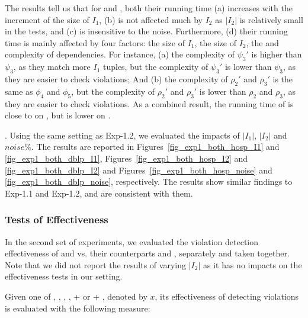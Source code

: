 The results tell us that for \CINDs and \pCINDs, both their running time (a) increases with the increment of the size of $I_1$, (b) is not affected much by $I_2$ as $|I_2|$ is relatively small in the tests, and (c) is insensitive to the noise. Furthermore, (d) their running time is mainly affected by four factors: the size of $I_1$, the size of $I_2$, the \LHS and \RHS complexity of dependencies.
For instance, (a) the \LHS complexity of \CIND $\psi_3'$ is higher than \pCFD $\psi_3$, as they match more $I_1$ tuples, but
the \RHS complexity of \CIND $\psi_3'$ is lower than \pCIND $\psi_3$, as they are easier to check violations; And
(b) the \LHS complexity of \CINDs $\rho_2'$ and $\rho_3'$ is the same as  \pCFDs $\phi_4$ and $\phi_5$, but
 the \RHS complexity of \CINDs $\rho_2'$ and $\rho_3'$ is lower than \pCINDs $\rho_2$ and $\rho_3$, as they are easier to check violations.
As a combined result, the running time of \CINDs is close to \pCFDs on \hosp, but is lower on \dblp.

.
Using the same setting as {Exp-1.2}, we evaluated the impacts of $|I_1|$, $|I_2|$ and $noise\%$. The results are reported in Figures~\ref{fig_exp1_both_hosp_I1} and \ref{fig_exp1_both_dblp_I1}, Figures~\ref{fig_exp1_both_hosp_I2} and \ref{fig_exp1_both_dblp_I2} and Figures~\ref{fig_exp1_both_hosp_noise} and \ref{fig_exp1_both_dblp_noise}, respectively. The results show similar findings to {Exp-1.1} and {Exp-1.2}, and are consistent with them.



\vspace{-1ex}
\subsubsection{Tests of Effectiveness}


In the second set of experiments, we evaluated the violation detection effectiveness of  \pCFDs and \pCINDs vs. their counterparts \CFDs and \CINDs, separately and taken together. Note that we did not report the results of varying $|I_{2}|$ as it has no impacts on the effectiveness tests in our setting.


Given one of \CFDs, \pCFDs, \CINDs, \pCINDs,  \CFDs + \CINDs or \pCFDs + \pCINDs, denoted by $x$, its effectiveness of detecting violations is evaluated with the following measure:

\vspace{0ex}




